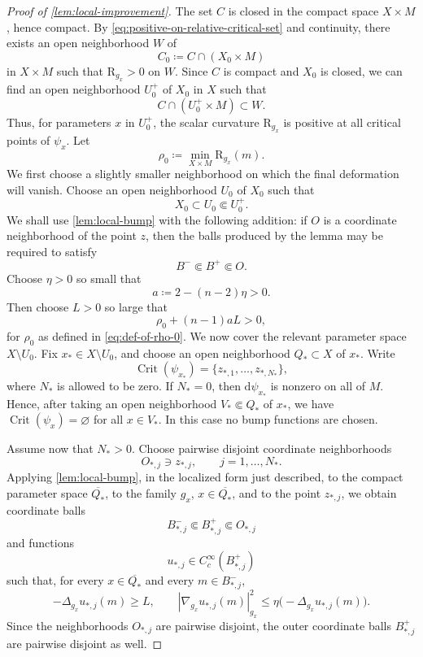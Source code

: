 \documentclass[11pt]{amsart}
\numberwithin{equation}{section}
\newcommand{\scal}{\mathrm{R}}
\DeclareMathOperator{\Crit}{Crit}
\let\geq\geqslant
\let\leq\leqslant
\begin{document}
\begin{proof}[Proof of \cref{lem:local-improvement}]
The set $C$ is closed in the compact space $X\times M$, hence compact. By
\eqref{eq:positive-on-relative-critical-set} and continuity, there exists an open neighborhood $W$ of
\[
 C_0\coloneqq C\cap(X_0\times M)
\]
in $X\times M$ such that $\scal_{g_x}>0$ on $W$. Since $C$ is compact and $X_0$ is closed, we can find an open neighborhood $U_0^+$ of $X_0$ in $X$ such that
\begin{equation}\label{eq:positive-near-X0}
 C\cap(U_0^+\times M)\subset W.
\end{equation}
Thus, for parameters $x$ in $U_0^+$, the scalar curvature $\scal_{g_x}$ is positive at all critical points of $\psi_x$.
Let
\begin{equation}\label{eq:def-of-rho-0}
  \rho_0\coloneqq \min_{X\times M} \scal_{g_x}(m).
\end{equation}
We first choose a slightly smaller neighborhood on which the final deformation will vanish. Choose an
open neighborhood \(U_0\) of \(X_0\) such that
\[
 X_0\subset U_0 \Subset U_0^+ .
\]
We shall use \cref{lem:local-bump} with the following addition: if \(O\) is a
coordinate neighborhood of the point \(z\), then the balls produced by the lemma may be required to satisfy
\[
 B^-\Subset B^+\Subset O.
\]
Choose \(\eta>0\) so small that
\begin{equation}\label{eq:eta-choice}
 a\coloneqq 2-(n-2)\eta>0.
\end{equation}
Then choose \(L>0\) so large that
\begin{equation}\label{eq:L-choice}
 \rho_0+(n-1)aL>0,
\end{equation}
for $\rho_0$ as defined in \eqref{eq:def-of-rho-0}.
We now cover the relevant parameter space \(X\setminus U_0\). Fix \(x_*\in X\setminus {U_0}\), and
choose an open neighborhood \(Q_*\subset X\) of \(x_*\). Write
\[
 \Crit(\psi_{x_*})=\{z_{*,1},\ldots,z_{*,N_*}\},
\]
where \(N_*\) is allowed to be zero. If \(N_*=0\), then \(\mathrm d\psi_{x_*}\) is nonzero on all of \(M\). Hence, after taking an open
neighborhood \(V_*\Subset Q_*\) of \(x_*\), we have $
 \Crit(\psi_x)=\varnothing$
 for all $x\in V_*$.
In this case no bump functions are chosen.

Assume now that \(N_*>0\). Choose pairwise disjoint coordinate neighborhoods
\[
 O_{*,j}\ni z_{*,j},
 \qquad j=1,\ldots,N_* .
\]
Applying \cref{lem:local-bump}, in the localized form just described, to the compact parameter
space \(\overline{Q_*}\), to the family \(g_x\), \(x\in \overline{Q_*}\), and to the point \(z_{*,j}\), we obtain
coordinate balls
\[
 B_{*,j}^-\Subset B_{*,j}^+\Subset O_{*,j}
\]
and functions
\[
 u_{*,j}\in C_c^\infty(B_{*,j}^+)
\]
such that, for every \(x\in\overline{Q_*}\) and every \(m\in B_{*,j}^-\),
\[
 -\Delta_{g_x}u_{*,j}(m)\geq L,
 \qquad
 |\nabla_{g_x}u_{*,j}(m)|_{g_x}^2
 \leq
 \eta\bigl(-\Delta_{g_x}u_{*,j}(m)\bigr).
\]
Since the neighborhoods \(O_{*,j}\) are pairwise disjoint, the outer coordinate balls \(B_{*,j}^+\) are pairwise
disjoint as well.


\end{proof}
\end{document}
